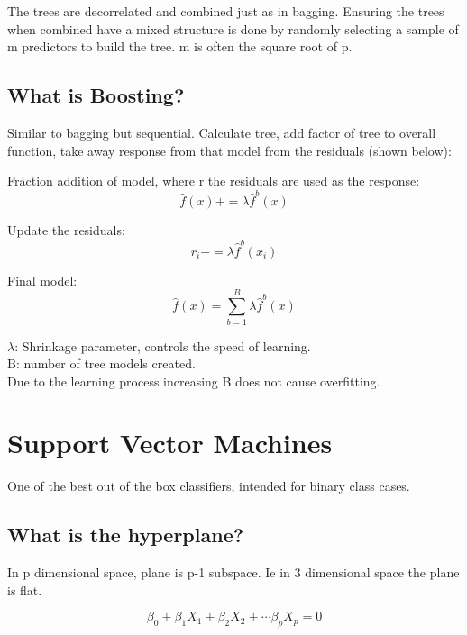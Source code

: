 \documentclass[11pt]{scrartcl} %
\begin{document}
The trees are decorrelated and combined just as in bagging. Ensuring the trees when combined have a
mixed structure is done by randomly selecting a sample of m predictors to build the tree. m is often
the square root of p.

\subsection{What is Boosting?}

Similar to bagging but sequential. Calculate tree, add factor of tree to overall function, take away
response from that model from the residuals (shown below):

Fraction addition of model, where r the residuals are used as the response:
\begin{equation}
	\hat{f}(x) += \lambda \hat{f}^b(x)
\end{equation}

Update the residuals:
\begin{equation}
	r_i -= \lambda \hat{f}^b(x_i)
\end{equation}

Final model:
\begin{equation}
	\hat{f}(x) = \sum^B_{b=1}{\lambda\hat{f}^b(x)}
\end{equation}

\(\lambda\): Shrinkage parameter, controls the speed of learning.\\
B: number of tree models created.\\

Due to the learning process increasing B does not cause overfitting.

\section{Support Vector Machines}

One of the best out of the box classifiers, intended for binary class cases.

\subsection{What is the hyperplane?}

In p dimensional space, plane is p-1 subspace. Ie in 3 dimensional space the plane is flat.

\begin{equation}
	\beta_0 + \beta_1X_1 + \beta_2X_2 + \cdots \beta_pX_p = 0
\end{equation}
\end{document}
